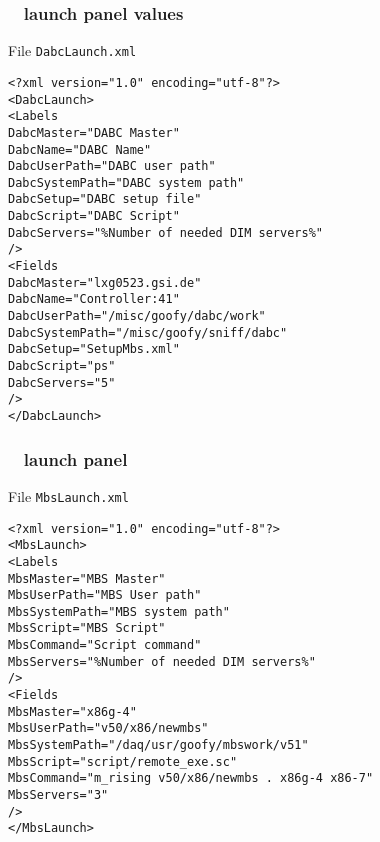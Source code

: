 \subsubsection{\dabc~ launch panel values}
File {\tt DabcLaunch.xml}
\begin{verbatim}
<?xml version="1.0" encoding="utf-8"?>
<DabcLaunch>
<Labels
DabcMaster="DABC Master"
DabcName="DABC Name"
DabcUserPath="DABC user path"
DabcSystemPath="DABC system path"
DabcSetup="DABC setup file"
DabcScript="DABC Script"
DabcServers="%Number of needed DIM servers%"
/>
<Fields
DabcMaster="lxg0523.gsi.de"
DabcName="Controller:41"
DabcUserPath="/misc/goofy/dabc/work"
DabcSystemPath="/misc/goofy/sniff/dabc"
DabcSetup="SetupMbs.xml"
DabcScript="ps"
DabcServers="5"
/>
</DabcLaunch>
\end{verbatim}
\subsubsection{\mbs~ launch panel}
File {\tt MbsLaunch.xml}
\begin{verbatim}
<?xml version="1.0" encoding="utf-8"?>
<MbsLaunch>
<Labels
MbsMaster="MBS Master"
MbsUserPath="MBS User path"
MbsSystemPath="MBS system path"
MbsScript="MBS Script"
MbsCommand="Script command"
MbsServers="%Number of needed DIM servers%"
/>
<Fields
MbsMaster="x86g-4"
MbsUserPath="v50/x86/newmbs"
MbsSystemPath="/daq/usr/goofy/mbswork/v51"
MbsScript="script/remote_exe.sc"
MbsCommand="m_rising v50/x86/newmbs . x86g-4 x86-7"
MbsServers="3"
/>
</MbsLaunch>
\end{verbatim}




